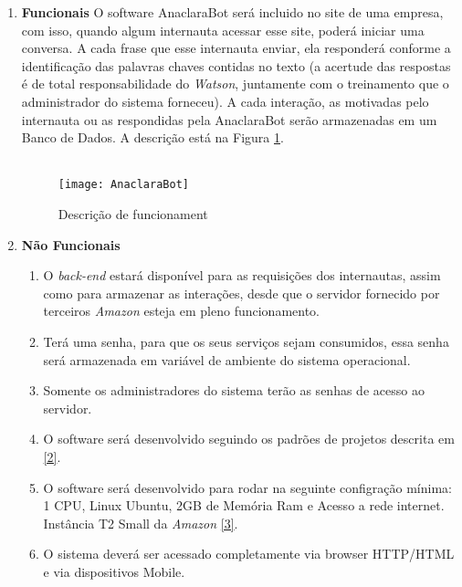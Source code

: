 
\begin{enumerate}
\item \textbf{Funcionais} O software AnaclaraBot será incluido no site de uma empresa, com isso, quando algum internauta acessar esse site, poderá iniciar uma conversa. A cada frase que esse internauta enviar, ela responderá conforme a identificação das palavras chaves contidas no texto (a acertude das respostas é de total responsabilidade do \textit{Watson}, juntamente com o treinamento que o administrador do sistema forneceu). A cada interação, as motivadas pelo internauta ou as respondidas pela AnaclaraBot serão armazenadas em um Banco de Dados. A descrição está na Figura \ref{fig:ana}.
\\
\\
\begin{figure}[!ht]
  \centering
      \texttt{[image: AnaclaraBot]}
  \caption{Descrição de funcionament}
  \label{fig:ana}
\end{figure}


\item \textbf{Não Funcionais} 
\begin{enumerate}
\item O \textit{back-end} estará disponível para as requisições dos internautas, assim como para armazenar as interações, desde que o servidor fornecido por terceiros \textit{Amazon} esteja em pleno funcionamento.

\item Terá uma senha, para que os seus serviços sejam consumidos, essa senha será armazenada em variável de ambiente do sistema operacional.

\item Somente os administradores do sistema terão as senhas de acesso ao servidor.

\item O software será desenvolvido seguindo os padrões de projetos descrita em \hyperref[designpat]{[2]}.

\item O software será desenvolvido para rodar na seguinte configração mínima: 1 CPU, Linux Ubuntu, 2GB de Memória Ram e Acesso a rede internet. Instância T2 Small da \textit{Amazon} \hyperref[amazon]{[3]}.

\item O sistema deverá ser acessado completamente via browser HTTP/HTML e via dispositivos Mobile.

\end{enumerate}


\end{enumerate}